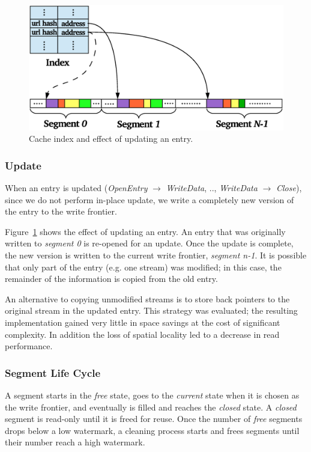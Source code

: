 \documentclass[letterpaper,twocolumn,10pt]{article}
\begin{document}
\begin{figure}[t]
  \begin{center}
    \includegraphics[width=1.04\columnwidth]{graphs/update}
  \end{center}
  \caption{Cache index and effect of updating an entry.}
  \label{fig:update} 
\vspace{-0.2in}
\end{figure}

\subsubsection{Update}
When an entry is updated (\emph{OpenEntry} $\rightarrow$ \emph{WriteData}, ..,
\emph{WriteData} $\rightarrow$ \emph{Close}), since we do not perform in-place
update, we write a completely new version of the entry to the write frontier.

Figure~\ref{fig:update} shows the effect of updating an entry.  An entry that
was originally written to \emph{segment 0} is re-opened for an update.  Once the
update is complete, the new version is written to the current write frontier,
\emph{segment n-1}.  It is possible that only part of the entry (e.g. one
stream) was modified; in this case, the remainder of the information is copied
from the old entry.

An alternative to copying unmodified streams is to store back pointers to the
original stream in the updated entry. This strategy was evaluated; the resulting
implementation gained very little in space savings at the cost of significant
complexity. In addition the loss of spatial locality led to a decrease in read
performance.

\subsubsection{Segment Life Cycle}
A segment starts in the \emph{free} state, goes to the \emph{current} state when
it is chosen as the write frontier, and eventually is filled and reaches the
\emph{closed} state.  A \emph{closed} segment is read-only until it is freed for
reuse.  Once the number of \emph{free} segments drops below a low watermark, a
cleaning process starts and frees segments until their number reach a high
watermark.
\end{document}
